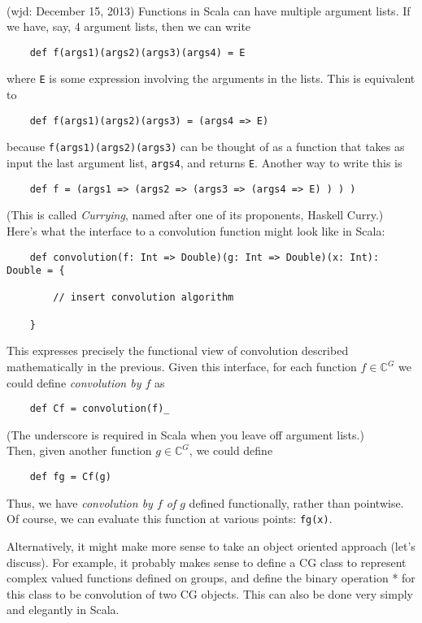 \documentclass[11pt]{article}
\newcommand\C{\ensuremath{\mathbb{C}}}
\begin{document}
\\[5pt]  (wjd: December 15, 2013)
Functions in Scala can have multiple argument lists. If we have, say, 4
argument lists, then we can write
{\small
\begin{verbatim}
    def f(args1)(args2)(args3)(args4) = E
\end{verbatim}}
\noindent where {\tt E} is some expression involving the arguments in the lists.
This is equivalent to
{\small
\begin{verbatim}
    def f(args1)(args2)(args3) = (args4 => E)
\end{verbatim}}
\noindent because {\tt f(args1)(args2)(args3)} can be thought of as a function that takes
as input the last argument list, {\tt args4}, and returns {\tt E}.
Another way to write this is
{\small
\begin{verbatim}
    def f = (args1 => (args2 => (args3 => (args4 => E) ) ) )
\end{verbatim}}
\noindent (This is called \emph{Currying}, named after one of its proponents, Haskell Curry.)
\\[5pt]  
Here's what the interface to a convolution function might look like in Scala:
{\small
\begin{verbatim}
    def convolution(f: Int => Double)(g: Int => Double)(x: Int): Double = {

        // insert convolution algorithm

    }
\end{verbatim}}
\noindent This expresses precisely the functional view of convolution
described mathematically in the previous.  Given this interface, for each 
function $f \in \C^G$ we could define \emph{convolution by $f$} as
{\small
\begin{verbatim}
    def Cf = convolution(f)_
\end{verbatim}}
\noindent (The underscore is required in Scala when you leave off argument
lists.) 
\\[5pt]  
Then, given another function $g \in \C^G$, we could define
{\small
\begin{verbatim}
    def fg = Cf(g)
\end{verbatim}
}  
\noindent Thus, we have 
\emph{convolution by $f$ of $g$} defined functionally, rather than pointwise.
Of course, we can evaluate this function at various points: {\tt fg(x)}.

Alternatively, it might make more sense to take an object oriented approach (let's
discuss).  For example, it probably makes sense to define a CG class to
represent complex valued functions defined on groups, and define the binary
operation * for this class to be convolution of two CG objects.  This can also
be done very simply and elegantly in Scala. 
\end{document}
